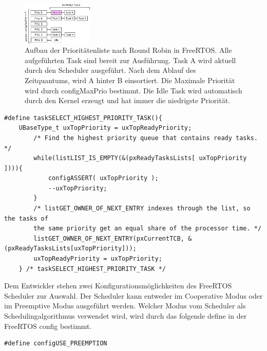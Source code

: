 \begin{figure}[ht!]
	\centering
		\includegraphics[width=0.3\textwidth]{Pictures/Scheduling/PrioList1.png}
	\caption{Aufbau der Prioritätenliste nach Round Robin in FreeRTOS. Alle aufgeführten Task sind bereit zur Ausführung. Task A wird aktuell durch den Scheduler ausgeführt. Nach dem Ablauf des Zeitquantums, wird A hinter B einsortiert. Die Maximale Priorität wird durch configMaxPrio bestimmt. Die Idle Task wird automatisch durch den Kernel erzeugt und hat immer die niedrigste Priorität. }
	\label{fig:PrioList1}
\end{figure}
\begin{lstlisting}[caption={FreeRTOS Source zur Priroty Task Selection aus Task.c. Alle lauffähigen Task werden in einem Array vewaltet pxReadyTaskLists. Die Listen verwalten sich durch Referenz-Pointer in den TCBs der einzelnen Tasks}, linewidth=8cm,captionpos=b, label=lst:nextTask, float=hbt]
#define taskSELECT_HIGHEST_PRIORITY_TASK(){																									
	UBaseType_t uxTopPriority = uxTopReadyPriority;														
		/* Find the highest priority queue that contains ready tasks. */								
		while(listLIST_IS_EMPTY(&(pxReadyTasksLists[ uxTopPriority ]))){																								
			configASSERT( uxTopPriority );																
			--uxTopPriority;																			
		}																								
		/* listGET_OWNER_OF_NEXT_ENTRY indexes through the list, so the tasks of						
		the	same priority get an equal share of the processor time. */									
		listGET_OWNER_OF_NEXT_ENTRY(pxCurrentTCB, &(pxReadyTasksLists[uxTopPriority]));			
		uxTopReadyPriority = uxTopPriority;																
	} /* taskSELECT_HIGHEST_PRIORITY_TASK */
\end{lstlisting}
\newline
\newline
Dem Entwickler stehen zwei Konfigurationsmöglichkeiten des FreeRTOS Scheduler zur Auswahl. Der Scheduler kann entweder im Cooperative Modus oder im Preemptive Modus ausgeführt werden. Welcher Modus vom Scheduler als Schedulingalgorithmus verwendet wird, wird durch das folgende define in der FreeRTOS config bestimmt.
\begin{lstlisting}[numbers = none]
#define configUSE_PREEMPTION
\end{lstlisting}
